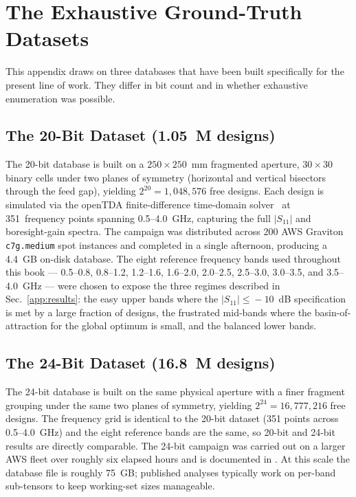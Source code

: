 \section{The Exhaustive Ground-Truth Datasets}
\label{app:datasets}

This appendix draws on three databases that have been built
specifically for the present line of work. They differ in bit count
and in whether exhaustive enumeration was possible.

\subsection{The 20-Bit Dataset (1.05~M designs)}

The 20-bit database is built on a $250 \times 250$~mm fragmented
aperture, $30 \times 30$ binary cells under two planes of symmetry
(horizontal and vertical bisectors through the feed gap), yielding
$2^{20} = 1{,}048{,}576$ free designs. Each design is simulated via
the openTDA finite-difference time-domain
solver~\cite{Yee1966FDTD,Taflove2005CompEM} at 351~frequency points
spanning 0.5--4.0~GHz, capturing the full $|S_{11}|$ and boresight-gain
spectra. The campaign was distributed across 200 AWS Graviton
\texttt{c7g.medium} spot instances and completed in a single
afternoon, producing a 4.4~GB on-disk database. The eight reference
frequency bands used throughout this book --- 0.5--0.8, 0.8--1.2,
1.2--1.6, 1.6--2.0, 2.0--2.5, 2.5--3.0, 3.0--3.5, and 3.5--4.0~GHz ---
were chosen to expose the three regimes described in
Sec.~\ref{app:results}: the easy upper bands where the
$|S_{11}| \!\le\! -10$~dB specification is met by a large fraction
of designs, the frustrated mid-bands where the basin-of-attraction
for the global optimum is small, and the balanced lower bands.

\subsection{The 24-Bit Dataset (16.8~M designs)}

The 24-bit database is built on the same physical aperture with a
finer fragment grouping under the same two planes of symmetry,
yielding $2^{24} = 16{,}777{,}216$ free designs. The frequency grid
is identical to the 20-bit dataset (351 points across 0.5--4.0~GHz)
and the eight reference bands are the same, so 20-bit and 24-bit
results are directly comparable. The 24-bit campaign was carried
out on a larger AWS fleet over roughly six elapsed hours and is
documented in \cite{Maloney2026Paper2}. At this scale the database
file is roughly 75~GB; published analyses typically work on
per-band sub-tensors to keep working-set sizes manageable.

